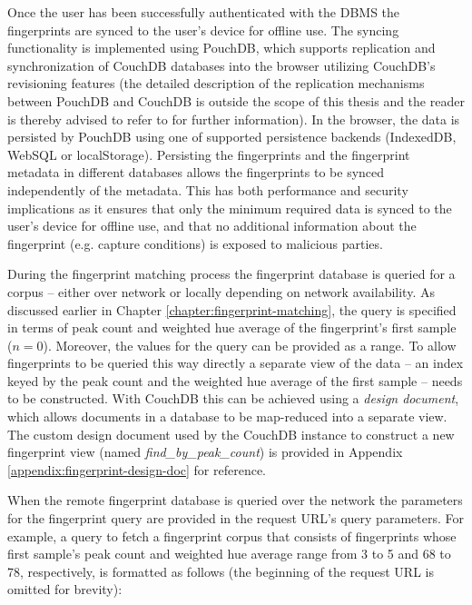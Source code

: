 \documentclass[thesis.tex]{subfiles}
\begin{document}
Once the user has been successfully authenticated with the DBMS the fingerprints are synced to the user's device for offline use. The syncing functionality is implemented using PouchDB, which supports replication and synchronization of CouchDB databases into the browser utilizing CouchDB's revisioning features (the detailed description of the replication mechanisms between PouchDB and CouchDB is outside the scope of this thesis and the reader is thereby advised to refer to \cite{pouch-couch-replication} for further information). In the browser, the data is persisted by PouchDB using one of supported persistence backends (IndexedDB, WebSQL or localStorage). Persisting the fingerprints and the fingerprint metadata in different databases allows the fingerprints to be synced independently of the metadata. This has both performance and security implications as it ensures that only the minimum required data is synced to the user's device for offline use, and that no additional information about the fingerprint (e.g. capture conditions) is exposed to malicious parties.

During the fingerprint matching process the fingerprint database is queried for a corpus -- either over network or locally depending on network availability. As discussed earlier in Chapter \ref{chapter:fingerprint-matching}, the query is specified in terms of peak count and weighted hue average of the fingerprint's first sample ($n=0$). Moreover, the values for the query can be provided as a range. To allow fingerprints to be queried this way directly a separate view of the data -- an index keyed by the peak count and the weighted hue average of the first sample -- needs to be constructed. With CouchDB this can be achieved using a \emph{design document}, which allows documents in a database to be map-reduced into a separate view. The custom design document used by the CouchDB instance to construct a new fingerprint view (named \emph{find\_by\_peak\_count}) is provided in Appendix \ref{appendix:fingerprint-design-doc} for reference.

When the remote fingerprint database is queried over the network the parameters for the fingerprint query are provided in the request URL's query parameters. For example, a query to fetch a fingerprint corpus that consists of fingerprints whose first sample's peak count and weighted hue average range from 3 to 5 and 68 to 78, respectively, is formatted as follows (the beginning of the request URL is omitted for brevity):\\
\end{document}

